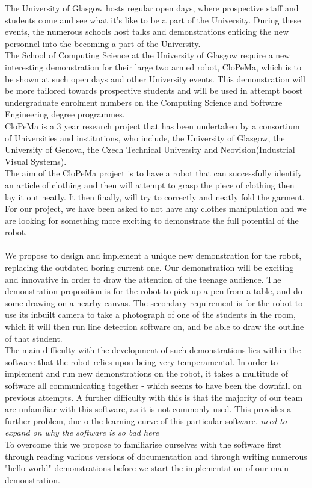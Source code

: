 \documentclass[preprint,12pt]{elsarticle}
\begin{document}
\noindent The University of Glasgow hosts regular open days, where prospective staff and students come and see what it's like to be a part of the University. During these events, the numerous schools host talks and demonstrations enticing the new personnel into the becoming a part of the University. \\
The School of Computing Science at the University of Glasgow require a new interesting demonstration for their large two armed robot, CloPeMa, which is to be shown at such open days and other University events. This demonstration will be more tailored towards prospective students and will be used in attempt boost undergraduate enrolment numbers on the Computing Science and Software Engineering degree programmes.\\
CloPeMa is a 3 year research project that has been undertaken by a consortium of Universities and institutions, who include, the University of Glasgow, the University of Genova, the Czech Technical University and Neovision(Industrial Visual Systems).\\
The aim of the CloPeMa project is to have a robot that can successfully identify an article of clothing and then will attempt to grasp the piece of clothing then lay it out neatly. It then finally, will try to correctly and neatly fold the garment. For our project, we have been asked to not have any clothes manipulation and we are looking for something more exciting to demonstrate the full potential of the robot. \\
\\
We propose to design and implement a unique new demonstration for the robot, replacing the outdated boring current one. Our demonstration will be exciting and innovative in order to draw the attention of the teenage audience. The demonstration proposition is for the robot to pick up a pen from a table, and do some drawing on a nearby canvas. The secondary requirement is for the robot to use its inbuilt camera to take a photograph of one of the students in the room, which it will then run line detection software on, and be able to draw the outline of that student.\\
The main difficulty with the development of such demonstrations lies within the software that the robot relies upon being very temperamental. In order to implement and run new demonstrations on the robot, it takes a multitude of software all communicating together - which seems to have been the downfall on previous attempts. A further difficulty with this is that the majority of our team are unfamiliar with this software, as it is not commonly used. This provides a further problem, due o the learning curve of this particular software. \textit{need to expand on why the software is so bad here} \\
To overcome this we propose to familiarise ourselves with the software first through reading various versions of documentation and through writing numerous "hello world" demonstrations before we start the implementation of our main demonstration.\\
\end{document}
